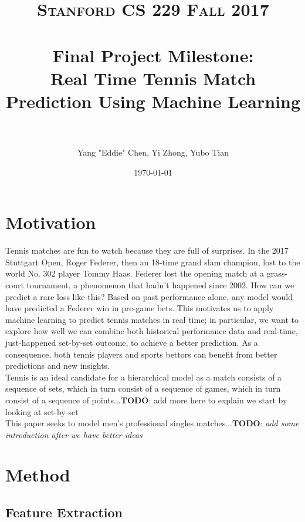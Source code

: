 \documentclass[paper=a4, fontsize=11pt]{scrartcl} %
\title{	
\normalfont \normalsize 
\textsc{Stanford CS 229 Fall 2017} \\ [25pt] %
\horrule{0.5pt} \\[0.4cm] %
\Large Final Project Milestone: \\
\Large Real Time Tennis Match Prediction Using Machine Learning\\ %
\horrule{2pt} \\[0.5cm] %
}
\author{Yang "Eddie" Chen, Yi Zhong, Yubo Tian} %
\date{\normalsize\today} %
\numberwithin{equation}{section} %
\numberwithin{figure}{section} %
\numberwithin{table}{section} %
\begin{document}
\maketitle %


\section{Motivation}
Tennis matches are fun to watch because they are full of surprises. In the 2017 Stuttgart Open, Roger Federer, then an 18-time grand slam champion, lost to the world No. 302 player Tommy Haas. Federer lost the opening match at a grass-court tournament, a phenomenon that hadn't happened since 2002. How can we predict a rare loss like this? Based on past performance alone, any model would have predicted a Federer win in pre-game bets. This motivates us to apply machine learning to predict tennis matches in real time; in particular, we want to explore how well we can combine both historical performance data and real-time, just-happened set-by-set outcome, to achieve a better prediction. As a consequence, both tennis players and sports bettors can benefit from better predictions and new insights. \\

Tennis is an ideal candidate for a hierarchical model as a match consists of a sequence of sets, which in turn consist of a sequence of games, which in turn consist of a sequence of points...\textbf{TODO}: add more here to explain we start by looking at set-by-set \cite{tennis1}\\

This paper seeks to model men's professional singles matches...\textbf{TODO}: \textit{add some introduction after we have better ideas} \\

\section{Method}
\subsection{Feature Extraction}
\end{document}
